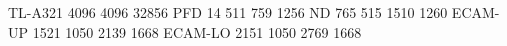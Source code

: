 TL-A321 4096 4096 32856
PFD       14  511  759 1256
ND       765  515 1510 1260
ECAM-UP 1521 1050 2139 1668
ECAM-LO 2151 1050 2769 1668
